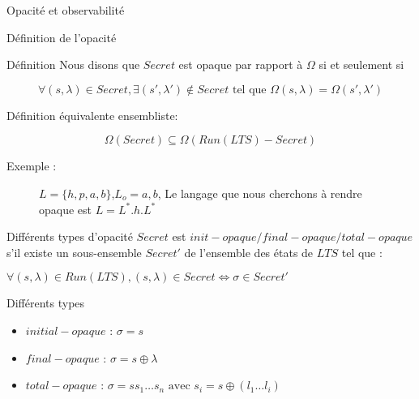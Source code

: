 \documentclass[11pt]{beamer}
\begin{document}
\begin{section}{Opacit\'e et observabilit\'e}
\begin{frame}{D\'efinition de l'opacit\'e}
\begin{block}{D\'efinition}
     Nous disons que $Secret$ est opaque par rapport \`a $\Omega$ si et seulement si
	
	$$\forall (s,\lambda) \in Secret, \exists (s',\lambda')\not\in Secret \mbox{ tel que } \Omega(s,\lambda) = \Omega (s',\lambda')$$
	
	D\'efinition \'equivalente ensembliste:
	
	$$\Omega(Secret)\subseteq \Omega(Run(LTS)-Secret)$$
    \end{block}
  \end{frame}
  
  \begin{frame}{Exemple :}
    \begin{figure}[H]
                \centering
                \caption{$L = \{h,p,a,b\}$,$L_o = {a,b}$, Le langage que nous cherchons \`a rendre opaque est $L = L^*.h.L^*$}
		\end{figure}		
   
  \end{frame}

  
  \begin{frame}{Diff\'erents types d'opacit\'e}
    $Secret$ est $init-opaque/final-opaque/total-opaque$ s'il existe un sous-ensemble  $Secret'$ de l'ensemble des \'etats de $LTS$ tel que :
    
    $\forall (s,\lambda) \in Run(LTS), (s, \lambda) \in Secret \Leftrightarrow \sigma \in Secret'$
    
    \begin{block}{Diff\'erents types}
      \begin{itemize}
	\item $initial-opaque$ : $\sigma = s$
	\item $final-opaque$ : $\sigma = s\oplus \lambda$
	\item $total-opaque$ : $\sigma = s s_1 \dots s_n \mbox{ avec } s_i = s\oplus(l_1\dots l_i)$
      \end{itemize} 


\end{block}
\end{frame}
\end{section}
\end{document}
